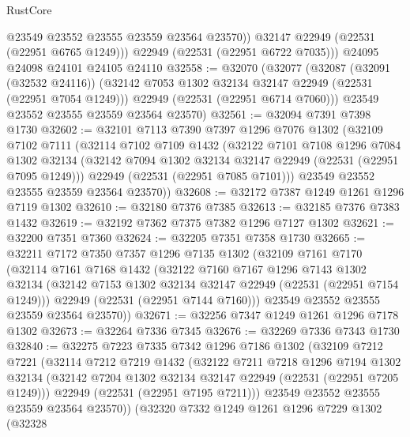 \begin{lexlean}{RustCore}
\begin{coremodule}
            @23549
            @23552
            @23555
            @23559
            @23564
            @23570))
        @32147
        @22949
        (@22531 (@22951 @6765 @1249)))
      @22949
      (@22531 (@22951 @6722 @7035)))
    @24095
    @24098
    @24101
    @24105
    @24110
@32558 := @32070
    (@32077
      (@32087
        (@32091 (@32532 @24116))
        (@32142 @7053 @1302 @32134 @32147 @22949 (@22531 (@22951 @7054 @1249)))
        @22949
        (@22531 (@22951 @6714 @7060)))
      @23549
      @23552
      @23555
      @23559
      @23564
      @23570)
@32561 := @32094 @7391 @7398 @1730
@32602 := @32101
    @7113
    @7390
    @7397
    @1296
    @7076
    @1302
    (@32109
      @7102
      @7111
      (@32114
        @7102
        @7109
        @1432
        (@32122
          @7101
          @7108
          @1296
          @7084
          @1302
          @32134
          (@32142 @7094 @1302 @32134 @32147 @22949 (@22531 (@22951 @7095 @1249)))
          @22949
          (@22531 (@22951 @7085 @7101)))
        @23549
        @23552
        @23555
        @23559
        @23564
        @23570))
@32608 := @32172 @7387 @1249 @1261 @1296 @7119 @1302
@32610 := @32180 @7376 @7385
@32613 := @32185 @7376 @7383 @1432
@32619 := @32192 @7362 @7375 @7382 @1296 @7127 @1302
@32621 := @32200 @7351 @7360
@32624 := @32205 @7351 @7358 @1730
@32665 := @32211
    @7172
    @7350
    @7357
    @1296
    @7135
    @1302
    (@32109
      @7161
      @7170
      (@32114
        @7161
        @7168
        @1432
        (@32122
          @7160
          @7167
          @1296
          @7143
          @1302
          @32134
          (@32142 @7153 @1302 @32134 @32147 @22949 (@22531 (@22951 @7154 @1249)))
          @22949
          (@22531 (@22951 @7144 @7160)))
        @23549
        @23552
        @23555
        @23559
        @23564
        @23570))
@32671 := @32256 @7347 @1249 @1261 @1296 @7178 @1302
@32673 := @32264 @7336 @7345
@32676 := @32269 @7336 @7343 @1730
@32840 := @32275
    @7223
    @7335
    @7342
    @1296
    @7186
    @1302
    (@32109
      @7212
      @7221
      (@32114
        @7212
        @7219
        @1432
        (@32122
          @7211
          @7218
          @1296
          @7194
          @1302
          @32134
          (@32142 @7204 @1302 @32134 @32147 @22949 (@22531 (@22951 @7205 @1249)))
          @22949
          (@22531 (@22951 @7195 @7211)))
        @23549
        @23552
        @23555
        @23559
        @23564
        @23570))
    (@32320
      @7332
      @1249
      @1261
      @1296
      @7229
      @1302
      (@32328

\end{coremodule}
\end{lexlean}
